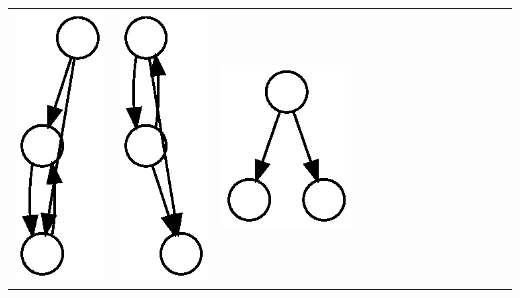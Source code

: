 \begin{table}[t!]
\begin{tabular}{l|lllllllllllll}
    \includegraphics[height=0.03\textheight]{M6-plain} &
    \includegraphics[height=0.03\textheight]{M7-plain} &
    \includegraphics[height=0.03\textheight]{M8-plain} &

\end{tabular}
\end{table}
